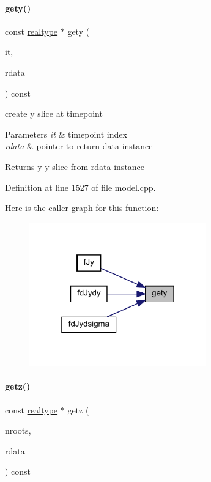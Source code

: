 \paragraph{\texorpdfstring{gety()}{gety()}}
{\footnotesize\ttfamily const \mbox{\hyperlink{namespaceamici_a1bdce28051d6a53868f7ccbf5f2c14a3}{realtype}} $\ast$ gety (\begin{DoxyParamCaption}\item[{const int}]{it,  }\item[{const \mbox{\hyperlink{classamici_1_1_return_data}{Return\+Data}} $\ast$}]{rdata }\end{DoxyParamCaption}) const\hspace{0.3cm}{\ttfamily [protected]}}

create y slice at timepoint 
\begin{DoxyParams}{Parameters}
{\em it} & timepoint index \\
\hline
{\em rdata} & pointer to return data instance \\
\hline
\end{DoxyParams}
\begin{DoxyReturn}{Returns}
y y-\/slice from rdata instance 
\end{DoxyReturn}


Definition at line 1527 of file model.\+cpp.

Here is the caller graph for this function\+:
\nopagebreak
\begin{figure}[H]
\begin{center}
\leavevmode
\includegraphics[width=217pt]{classamici_1_1_model_aee6c7b534a091180c01aabb3be44a216_icgraph}
\end{center}
\end{figure}
\mbox{\label{classamici_1_1_model_a30571e418f94ca61b8df2b355e46ee1a}} 
\paragraph{\texorpdfstring{getz()}{getz()}}
{\footnotesize\ttfamily const \mbox{\hyperlink{namespaceamici_a1bdce28051d6a53868f7ccbf5f2c14a3}{realtype}} $\ast$ getz (\begin{DoxyParamCaption}\item[{const int}]{nroots,  }\item[{const \mbox{\hyperlink{classamici_1_1_return_data}{Return\+Data}} $\ast$}]{rdata }\end{DoxyParamCaption}) const\hspace{0.3cm}{\ttfamily [protected]}}


